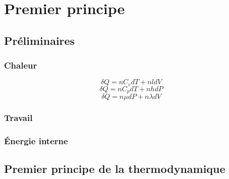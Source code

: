 \chapter{Premier principe}
\section{Préliminaires}
\subsection{Chaleur}
$$\delta Q = nC_vdT+nldV$$
$$\delta Q = nC_pdT+nhdP$$
$$\delta Q = n\mu dP+n\lambda dV$$
\subsection{Travail}
\subsection{Énergie interne}
\section{Premier principe de la thermodynamique}
\begin{thm}

\end{thm}